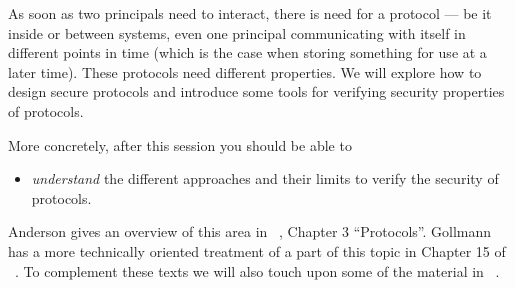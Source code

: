 As soon as two principals need to interact, there is need for a protocol --- be 
it inside or between systems, even one principal communicating with itself in 
different points in time (which is the case when storing something for use at a 
later time).
These protocols need different properties.
We will explore how to design secure protocols and introduce some tools for 
verifying security properties of protocols.

More concretely, after this session you should be able to
\begin{itemize}
  \item \emph{understand} the different approaches and their limits to verify 
    the security of protocols.
\end{itemize}

Anderson gives an overview of this area in 
~\cite{Anderson2008sea}, Chapter 
3 \enquote{Protocols}.
Gollmann has a more technically oriented treatment of a part of this topic in 
Chapter 15 of ~\cite{Gollmann2011cs}.
To complement these texts we will also touch upon some of the material in 
~\cite{ProVerif}.
